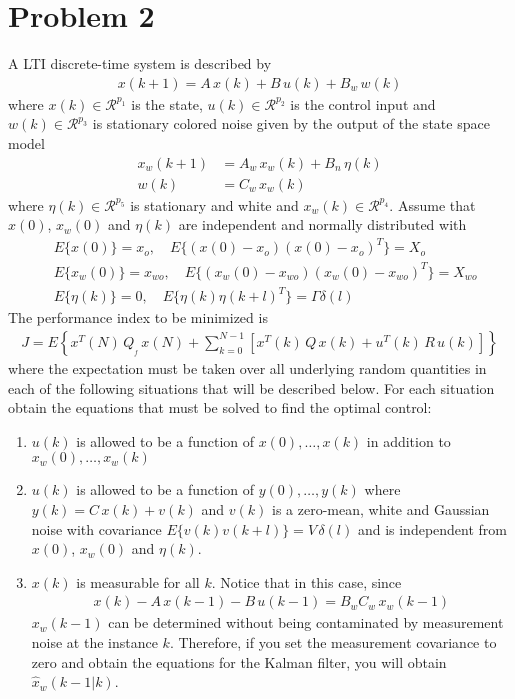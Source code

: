 \section*{Problem 2}

A LTI discrete-time system is described by
\begin{align*}
    x(k+1) = A \, x(k) + B\, u(k) + B_w \, w(k)
\end{align*}
where $x(k) \in \mathcal{R}^{p_1}$ is the state, $u(k) \in \mathcal{R}^{p_2}$ is the control input and $w(k) \in \mathcal{R}^{p_3}$ is stationary colored noise given by the output of the state space model
\begin{align*}
    x_w(k+1) & = A_w \, x_w(k) + B_n \, \eta(k) \\
    w(k) & = C_w \, x_w(k)
\end{align*}
where $\eta(k) \in \mathcal{R}^{p_5}$ is stationary and white and $x_w(k) \in \mathcal{R}^{p_4}$. Assume that $x(0)$, $x_w(0)$  and $\eta(k)$ are independent and normally distributed with
\begin{align*}
    &E\{ x(0) \} = x_o, \hspace{1em} E\{ (x(0) - x_o)(x(0) - x_o)^T \} = X_o\\
    &E\{ x_w(0) \} = x_{wo}, \hspace{1em} E\{ (x_{w}(0) - x_{wo})(x_{w}(0) - x_{wo})^T \} = X_{wo}\\
    &E\{ \eta(k) \} = 0, \hspace{1em} E\{ \eta(k)\eta(k+l)^T \} = \Gamma \delta(l)
\end{align*}
The performance index to be minimized is
\begin{align*}
    J = E \left \{ x^T(N)\,  Q_{_f} \, x(N) + \sum_{k=0}^{N-1}
        \left [x^T(k)\,  Q \, x(k) + u^T(k)\,  R \, u(k) \right ] \right \}
\end{align*}
where the expectation must be taken over all underlying  random quantities in each of the following situations that will be described below. For each situation obtain the equations that must be solved to find the optimal control:

\begin{enumerate}
\item
$u(k)$ is allowed to be a function of $x(0),\ldots,x(k)$ in addition to $x_w(0),\ldots,x_w(k)$

\item
$u(k)$ is allowed to be a function of $y(0),\ldots,y(k)$ where $y(k) = C \, x(k) + v(k)$ and $v(k)$ is a zero-mean, white and Gaussian noise with covariance $E\{ v(k) v(k+l) \} = V\,\delta(l)$ and is independent from $x(0)$, $x_w(0)$ and $\eta(k)$.

\item
$x(k)$ is measurable for all $k$. Notice that in this case, since
\begin{align*}
x(k) - A \, x(k-1) - B \, u(k-1) = B_w C_w\, x_w(k-1)
\end{align*}
$x_w(k-1)$ can be determined without being contaminated by measurement noise at the instance $k$. Therefore, if you set the measurement covariance to zero and obtain the equations for the Kalman filter, you will obtain $\hat x_w(k-1 |k)$.

\end{enumerate}
